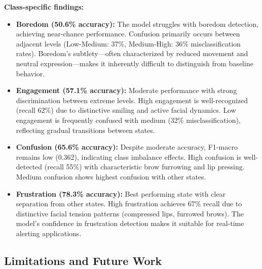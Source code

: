 \textbf{Class-specific findings:}
\begin{itemize}
    \item \textbf{Boredom (50.6\% accuracy):} The model struggles with boredom detection, achieving near-chance performance. Confusion primarily occurs between adjacent levels (Low-Medium: 37\%, Medium-High: 36\% misclassification rates). Boredom's subtlety---often characterized by reduced movement and neutral expression---makes it inherently difficult to distinguish from baseline behavior.

    \item \textbf{Engagement (57.1\% accuracy):} Moderate performance with strong discrimination between extreme levels. High engagement is well-recognized (recall 62\%) due to distinctive smiling and active facial dynamics. Low engagement is frequently confused with medium (32\% misclassification), reflecting gradual transitions between states.

    \item \textbf{Confusion (65.6\% accuracy):} Despite moderate accuracy, F1-macro remains low (0.362), indicating class imbalance effects. High confusion is well-detected (recall 55\%) with characteristic brow furrowing and lip pressing. Medium confusion shows highest confusion with other states.

    \item \textbf{Frustration (78.3\% accuracy):} Best performing state with clear separation from other states. High frustration achieves 67\% recall due to distinctive facial tension patterns (compressed lips, furrowed brows). The model's confidence in frustration detection makes it suitable for real-time alerting applications.
\end{itemize}

\subsection{Limitations and Future Work}
\label{sec:limitations}

